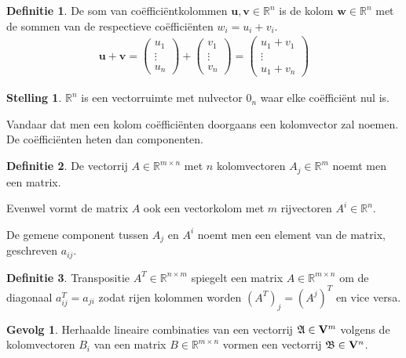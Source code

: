 \documentclass{amsart}
\theoremstyle{definition}
\newtheorem{thm}{Stelling}[section]
\newtheorem{dfn}{Definitie}[section]
\newtheorem{csq}{Gevolg}[section]
\newcommand{\realnums}{\mathbb{R}}
\newcommand{\realn}[1][n]{\realnums^{#1}}
\newcommand{\realmx}[2][n]{\realn[#2 \times #1]}
\newcommand{\realmxn}{\realmx{m}}
\newcommand{\vecspace}[1][v]{\mathrm{\mathbf{\MakeUppercase#1}}}
\newcommand{\vecspacen}[1][n]{\vecspace^#1}
\newcommand{\vvec}[1][v]{\mathbf{#1}}
\newcommand{\vecrow}[1][a]{\mathfrak{\MakeUppercase{#1}}}
\begin{document}
\begin{dfn}
	De som van coëfficiëntkolommen $\vvec[u], \vvec \in \realn$ is de kolom $\vvec[w] \in \realn$ met de sommen van de respectieve coëfficiënten ${w}_i = {u}_i + {v}_i$.
	\begin{align*}
		\vvec[u] + \vvec =
		\begin{pmatrix}
			u_1    \\
			\vdots \\
			u_n
		\end{pmatrix}
		+
		\begin{pmatrix}
			v_1    \\
			\vdots \\
			v_n
		\end{pmatrix}
		=
		\begin{pmatrix}
			u_1 + v_1 \\
			\vdots    \\
			u_1 + v_n
		\end{pmatrix}
	\end{align*}
\end{dfn}

\begin{thm}
	$\realn$ is een vectorruimte met nulvector $0_n$ waar elke coëfficiënt nul is.
\end{thm}

Vandaar dat men een kolom coëfficiënten doorgaans een kolomvector zal noemen. De coëfficiënten heten dan componenten.

\begin{dfn}
	De vectorrij $A \in \realn[m \times n]$ met $n$ kolomvectoren $A_{j} \in \realn[m]$ noemt men een matrix.

	Evenwel vormt de matrix $A$ ook een vectorkolom met $m$ rijvectoren $A^i \in \realn$.

	De gemene component tussen $A_j$ en $A^i$ noemt men een element van de matrix, geschreven $a_{ij}$.
\end{dfn}

\begin{dfn}
	Transpositie $A^T \in \realmx[m]{n}$ spiegelt een matrix $A \in \realmxn$ om de diagonaal $a^T_{ij} = a_{ji}$ zodat rijen kolommen worden $(A^T)_j = (A^j)^T$ en vice versa.
\end{dfn}

\begin{csq}
	Herhaalde lineaire combinaties van een vectorrij $\vecrow \in \vecspacen[m]$ volgens de kolomvectoren $B_i$ van een matrix $B \in \realmxn$ vormen een vectorrij $\vecrow[b] \in \vecspacen$.
\end{csq}
\end{document}

